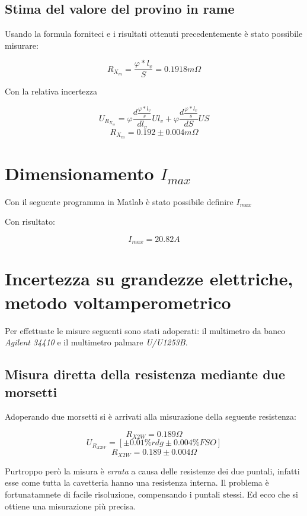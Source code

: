 \documentclass[a4paper]{article}
\begin{document}
\subsection{Stima del valore del provino in rame}
Usando la formula forniteci e i risultati ottenuti precedentemente è stato possibile misurare:
\begin{Large}
	\begin{equation}
		R_{X_{m}} =\frac{\varphi*l_v}{S}= 0.1918 m\Omega
	 \end{equation}
\end{Large}
Con la relativa incertezza
\begin{Large}
	\begin{equation}
		U_{R_{X_{m}}} = \varphi\frac{d\frac{\varphi*l_v}{s}}{dl_v}U{l_v}+\varphi\frac{d\frac{\varphi*l_v}{s}}{dS}U{S}
	 \end{equation}
	 \begin{equation}
		R_{X_{m}} =0.192\pm 0.004 m \Omega
	 \end{equation}
\end{Large}


\section{Dimensionamento $I_{max}$}
Con il seguente programma in Matlab è stato possibile definire $I_{max}$



Con risultato: 
\begin{Large}
	\begin{equation}
		I_{max} = 20.82 A
	 \end{equation}
\end{Large}


\section {Incertezza su grandezze elettriche, metodo voltamperometrico}
Per effettuate le misure seguenti sono stati adoperati: il multimetro da banco \emph{Agilent 34410} e il multimetro palmare \emph{U/U1253B}.
\subsection{Misura diretta della resistenza mediante due morsetti}
Adoperando due morsetti si è arrivati alla misurazione della seguente resistenza:
\begin{Large}
	\begin{equation}
		R_{X2W}= 0.189 \Omega
	\end{equation}
	\begin{equation}
		U_{R_{X2W}} = [\pm 0.01\%rdg \pm 0.004\% FSO]
	 \end{equation}
	 \begin{equation}
		R_{X2W} = 0.189 \pm 0.004 \Omega
	 \end{equation}
\end{Large}
Purtroppo però la misura è \emph{errata} a causa delle resistenze dei due puntali, infatti esse come tutta la cavetteria hanno una resistenza interna.
Il problema è fortunatamnete di facile risoluzione, compensando i puntali stessi. Ed ecco che si ottiene una misurazione più precisa.
\end{document}
